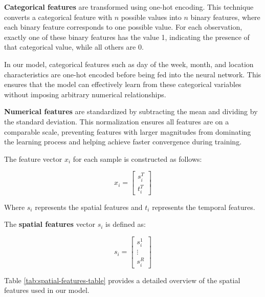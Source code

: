 \textbf{Categorical features} are transformed using one-hot encoding. This technique converts a categorical feature with $n$ possible values into $n$ binary features, where each binary feature corresponds to one possible value. For each observation, exactly one of these binary features has the value 1, indicating the presence of that categorical value, while all others are 0.


In our model, categorical features such as day of the week, month, and location characteristics are one-hot encoded before being fed into the neural network. This ensures that the model can effectively learn from these categorical variables without imposing arbitrary numerical relationships.

\textbf{Numerical features} are standardized by subtracting the mean and dividing by the standard deviation. This normalization ensures all features are on a comparable scale, preventing features with larger magnitudes from dominating the learning process and helping achieve faster convergence during training.

The feature vector $x_i$ for each sample is constructed as follows:

\[
    \renewcommand*{\arraystretch}{1.5}
    x_i = \begin{bmatrix}
        s_i^T \\
        t_i^T
    \end{bmatrix}
\]

Where $s_i$ represents the spatial features and $t_i$ represents the temporal features.

The \textbf{spatial features} vector $s_i$ is defined as:

\[
    s_i = \begin{bmatrix}
        s_i^1  \\
        \vdots \\
        s_i^R
    \end{bmatrix}
\]

Table \ref{tab:spatial-features-table} provides a detailed overview of the spatial features used in our model.

